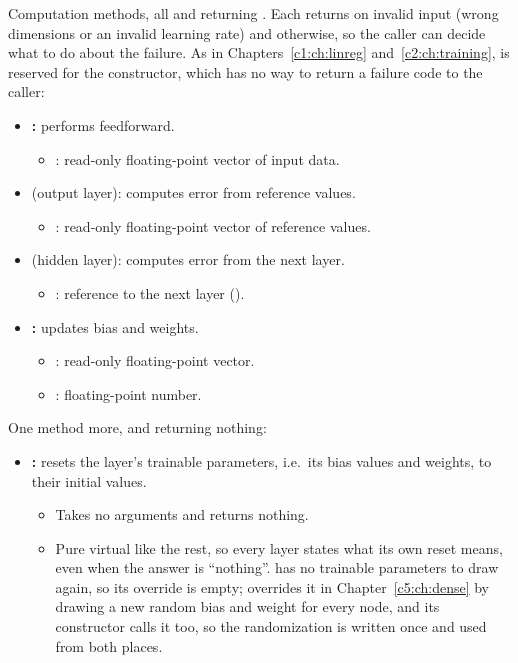 \noindent Computation methods, all  and returning . Each returns
 on invalid input (wrong dimensions or an invalid learning rate) and 
otherwise, so the caller can decide what to do about the failure. As in
Chapters~\ref{c1:ch:linreg} and~\ref{c2:ch:training},  is reserved for the
constructor, which has no way to return a failure code to the caller:
\begin{itemize}
  \item \textbf{:} performs feedforward.
  \begin{itemize}
    \item {}: read-only floating-point vector of input data.
  \end{itemize}
  \item \textbf{} (output layer): computes error from reference
    values.
  \begin{itemize}
    \item {}: read-only floating-point vector of reference values.
  \end{itemize}
  \item \textbf{} (hidden layer): computes error from the next
    layer.
  \begin{itemize}
    \item {}: reference to the next layer ().
  \end{itemize}
  \item \textbf{:} updates bias and weights.
  \begin{itemize}
    \item {}: read-only floating-point vector.
    \item {}: floating-point number.
  \end{itemize}
\end{itemize}
One method more,  and returning nothing:
\begin{itemize}
  \item \textbf{:} resets the layer's trainable parameters, i.e.\ its bias
    values and weights, to their initial values.
  \begin{itemize}
    \item Takes no arguments and returns nothing.
    \item Pure virtual like the rest, so every layer states what its own reset means, even when the
      answer is ``nothing''.  has no trainable parameters to draw again, so its override
      is empty;  overrides it in Chapter~\ref{c5:ch:dense} by drawing a new random bias
      and weight for every node, and its constructor calls it too, so the randomization is written
      once and used from both places.
  \end{itemize}
\end{itemize}

